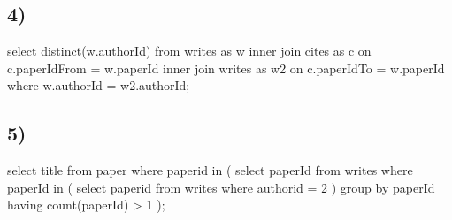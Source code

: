 \documentclass[a4paper,11pt]{report}
\begin{document}
\subsection*{4)}

\begin{sqlcode}
  select distinct(w.authorId)
  from writes as w
  inner join cites as c
    on c.paperIdFrom = w.paperId
  inner join writes as w2
    on c.paperIdTo = w.paperId
  where w.authorId = w2.authorId;
\end{sqlcode}

\newpage

\subsection*{5)}

\begin{sqlcode}
  select title 
  from paper 
  where paperid in (
    select paperId
    from writes
    where paperId in (
      select paperid 
      from writes 
      where authorid = 2
    )
    group by paperId
    having count(paperId) > 1
  );
\end{sqlcode}
\end{document}
